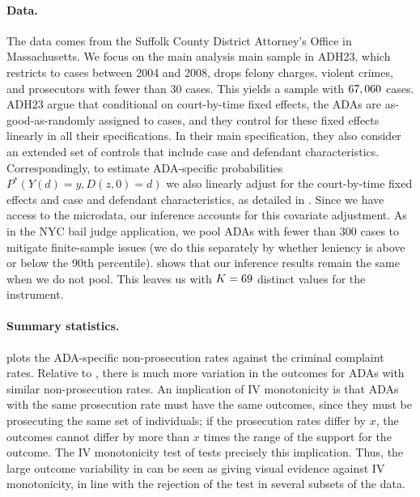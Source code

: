 \documentclass[12pt]{article}%
\theoremstyle{definition}
\newcommand\1{\operatorname{I}\indicatorfence}
\begin{document}
\paragraph{Data.} The data comes from the Suffolk County District Attorney’s
Office in Massachusetts. We focus on the main analysis main sample in ADH23,
which restricts to cases between 2004 and 2008, drops felony charges,
violent crimes, and prosecutors with fewer than 30 cases. This yields a sample
with $67,060$ cases. ADH23 argue that conditional on court-by-time fixed effects,
the ADAs are as-good-as-randomly assigned to cases, and they control for these
fixed effects linearly in all their specifications. In their main specification,
they also consider an extended set of controls that include case and defendant
characteristics. Correspondingly, to estimate ADA-specific probabilities
$P^*(Y(d)=y, D(z,0)=d)$ we also linearly adjust for the court-by-time fixed
effects and case and defendant characteristics, as detailed in
. Since we have access to the microdata, our inference
accounts for this covariate adjustment. As in the NYC bail judge application, we
pool ADAs with fewer than 300 cases to mitigate finite-sample issues (we do this separately by whether leniency is above or below the 90th percentile).
 shows that our inference results remain the same
when we do not pool. This leaves us with $K=69$ distinct values for the
instrument.

\paragraph{Summary statistics.}

 plots the ADA-specific non-prosecution rates against the
criminal complaint rates. Relative to , there is much more
variation in the outcomes for ADAs with similar non-prosecution rates. An
implication of IV monotonicity is that ADAs with the same prosecution
rate must have the same outcomes, since they must be prosecuting the same set of
individuals; if the prosecution rates differ by $x$, the outcomes cannot differ
by more than $x$ times the range of the support for the outcome. The IV
monotonicity test of \textcite{fll23} tests precisely this implication. Thus,
the large outcome variability in  can be seen as giving visual
evidence against IV monotonicity, in line with the rejection of the
\textcite{fll23} test in several subsets of the data.
\end{document}
